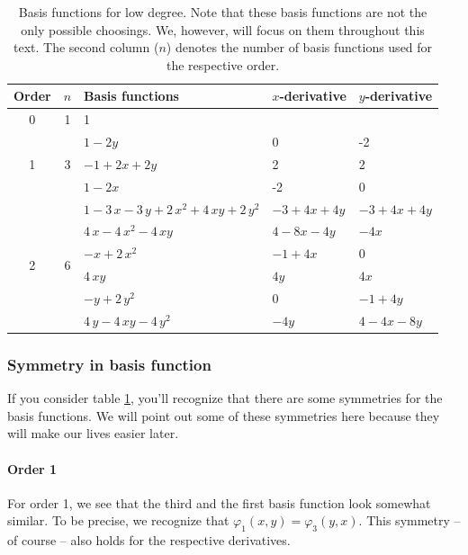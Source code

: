 \documentclass{article}
\renewcommand{\phi}{\varphi}
\begin{document}
\begin{table}[h]
  \centering
  \begin{tabular}{cclll}
    \toprule
    Order & $n$ & Basis functions & $x$-derivative & $y$-derivative \\
    \midrule
    \multirow{1}{*}{0} & 1 & 1 \\
    \midrule
    \multirow{3}{*}{1} & \multirow{3}{*}{3} & $1-2y$ & 0 & -2\\
    &  & $-1+2x+2y$ & 2 & 2\\
    &  & $1-2x$ & -2 & 0\\
    \midrule
    \multirow{6}{*}{2} & \multirow{6}{*}{6} & $1-3\,x-3\,y+2\,{x}^{2}+4\,xy+2\,{y}^{2}$ & $-3+4x+4y$ & $-3+4x+4y$\\ 
& & $4\,x-4\,{x}^{2}-4\,xy$ & $4-8x-4y$ & $-4x$\\ 
& & $-x+2\,{x}^{2}$ & $-1+4x$ & 0\\ 
& & $4\,xy$ & $4y$ & $4x$\\ 
& & $-y+2\,{y}^{2}$ & $0$ & $-1+4y$\\ 
& & $4\,y-4\,xy-4\,{y}^{2}$ & $-4y$ & $4-4x-8y$ \\
    \bottomrule
  \end{tabular}
  \caption{Basis functions for low degree. Note that these basis functions are not the only possible choosings. We, however, will focus on them throughout this text. The second column ($n$) denotes the number of basis functions used for the respective order.}
  \label{tab:basis-functions-for-low-degrees}
\end{table}

\subsubsection{Symmetry in basis function}
\label{sec:basis-function-symmetry}

If you consider table \ref{tab:basis-functions-for-low-degrees}, you'll recognize that there are some symmetries for the basis functions. We will point out some of these symmetries here because they will make our lives easier later.

\paragraph{Order 1}

For order 1, we see that the third and the first basis function look somewhat similar. To be precise, we recognize that $\phi_1(x,y)=\phi_3(y,x)$. This symmetry -- of course -- also holds for the respective derivatives.
\end{document}
